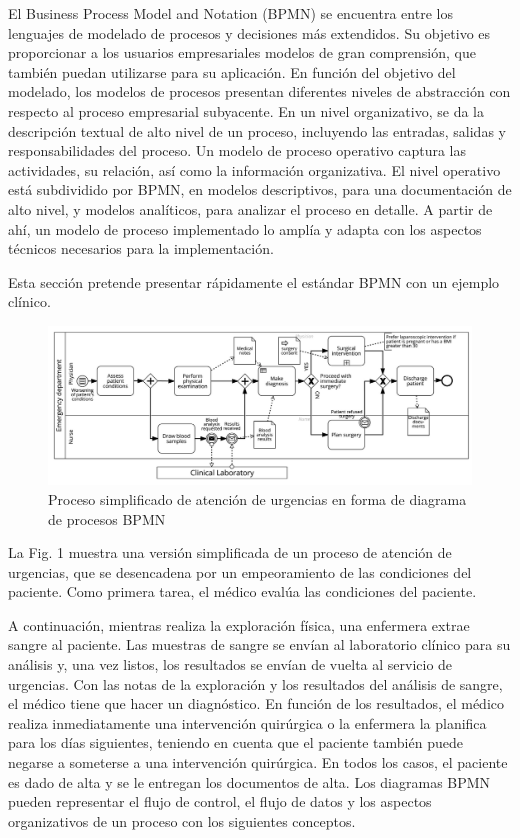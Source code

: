 El Business Process Model and Notation (BPMN) se encuentra entre los lenguajes de modelado de procesos y decisiones más extendidos. Su objetivo es proporcionar a los usuarios empresariales modelos de gran comprensión, que también puedan utilizarse para su aplicación. En función del objetivo del modelado, los modelos de procesos presentan diferentes niveles de abstracción con respecto al proceso empresarial subyacente. En un nivel organizativo, se da la descripción textual de alto nivel de un proceso, incluyendo las entradas, salidas y responsabilidades del proceso. Un modelo de proceso operativo captura las actividades, su relación, así como la información organizativa. El nivel operativo está subdividido por BPMN, en modelos descriptivos, para una documentación de alto nivel, y modelos analíticos, para analizar el proceso en detalle. A partir de ahí, un modelo de proceso implementado lo amplía y adapta con los aspectos técnicos necesarios para la implementación.

Esta sección pretende presentar rápidamente el estándar BPMN con un ejemplo clínico.

\begin{figure}[H]
    \centering 
    \includegraphics[width=\textwidth]{img/bpmn.png}
    \caption{Proceso simplificado de atención de urgencias en forma de diagrama de procesos BPMN}
    \label{fig:bpmn}
\end{figure}

La Fig. 1 muestra una versión simplificada de un proceso de atención de urgencias, que se desencadena por un empeoramiento de las condiciones del paciente. Como primera tarea, el médico evalúa las condiciones del paciente.

A continuación, mientras realiza la exploración física, una enfermera extrae sangre al paciente. Las muestras de sangre se envían al laboratorio clínico para su análisis y, una vez listos, los resultados se envían de vuelta al servicio de urgencias. Con las notas de la exploración y los resultados del análisis de sangre, el médico tiene que hacer un diagnóstico. En función de los resultados, el médico realiza inmediatamente una intervención quirúrgica o la enfermera la planifica para los días siguientes, teniendo en cuenta que el paciente también puede negarse a someterse a una intervención quirúrgica. En todos los casos, el paciente es dado de alta y se le entregan los documentos de alta. Los diagramas BPMN pueden representar el flujo de control, el flujo de datos y los aspectos organizativos de un proceso con los siguientes conceptos.

